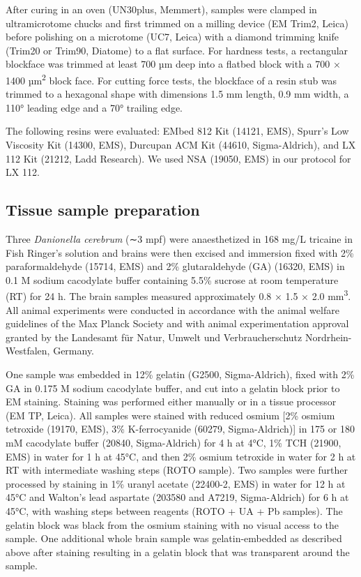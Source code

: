 \documentclass{article}
\begin{document}
After curing in an oven (UN30plus, Memmert), samples were clamped in ultramicrotome chucks and first trimmed on a milling device (EM Trim2, Leica) before polishing on a microtome (UC7, Leica) with a diamond trimming knife (Trim20 or Trim90, Diatome) to a flat surface. For hardness tests, a rectangular blockface was trimmed at least 700 µm deep into a flatbed block with a 700 × 1400 µm\textsuperscript{2} block face. For cutting force tests, the blockface of a resin stub was trimmed to a hexagonal shape with dimensions 1.5 mm length, 0.9 mm width, a 110° leading edge and a 70° trailing edge.

The following resins were evaluated: EMbed 812 Kit (14121, EMS), Spurr’s Low Viscosity Kit (14300, EMS), Durcupan ACM Kit (44610, Sigma-Aldrich), and LX 112 Kit (21212, Ladd Research). We used NSA (19050, EMS) in our protocol for LX 112.

\subsection*{Tissue sample preparation}

Three \emph{Danionella cerebrum} (∼3 mpf) were anaesthetized in 168 mg/L tricaine in Fish Ringer’s solution and brains were then excised and immersion fixed with 2\% paraformaldehyde (15714, EMS) and 2\% glutaraldehyde (GA) (16320, EMS) in 0.1 M sodium cacodylate buffer containing 5.5\% sucrose at room temperature (RT) for 24 h. The brain samples measured approximately 0.8 × 1.5 × 2.0 mm\textsuperscript{3}. All animal experiments were conducted in accordance with the animal welfare guidelines of the Max Planck Society and with animal experimentation approval granted by the Landesamt für Natur, Umwelt und Verbraucherschutz Nordrhein-Westfalen, Germany.

One sample was embedded in 12\% gelatin (G2500, Sigma-Aldrich), fixed with 2\% GA in 0.175 M sodium cacodylate buffer, and cut into a gelatin block prior to EM staining. Staining was performed either manually or in a tissue processor (EM TP, Leica). All samples were stained with reduced osmium [2\% osmium tetroxide (19170, EMS), 3\% K-ferrocyanide (60279, Sigma-Aldrich)] in 175 or 180 mM cacodylate buffer (20840, Sigma-Aldrich) for 4 h at 4°C, 1\% TCH (21900, EMS) in water for 1 h at 45°C, and then 2\% osmium tetroxide in water for 2 h at RT with intermediate washing steps (ROTO sample). Two samples were further processed by staining in 1\% uranyl acetate (22400-2, EMS) in water for 12 h at 45°C and Walton’s lead aspartate (203580 and A7219, Sigma-Aldrich) for 6 h at 45°C, with washing steps between reagents (ROTO + UA + Pb samples). The gelatin block was black from the osmium staining with no visual access to the sample. One additional whole brain sample was gelatin-embedded as described above after staining resulting in a gelatin block that was transparent around the sample.
\end{document}
